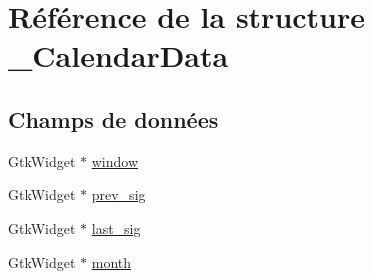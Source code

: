 \hypertarget{struct___calendar_data}{\section{Référence de la structure \-\_\-\-Calendar\-Data}
\label{struct___calendar_data}
}
\subsection*{Champs de données}
\begin{DoxyCompactItemize}
\item 
Gtk\-Widget $\ast$ \hyperlink{struct___calendar_data_a3d346c08cf2d67c388caabffb412b293}{window}
\item 
Gtk\-Widget $\ast$ \hyperlink{struct___calendar_data_aa524f6742b14404edf6891773daae7dd}{prev\-\_\-sig}
\item 
Gtk\-Widget $\ast$ \hyperlink{struct___calendar_data_a622d485dedd866926880ea6f497ab0d0}{last\-\_\-sig}
\item 
Gtk\-Widget $\ast$ \hyperlink{struct___calendar_data_aaf4edd0a3a5d01ee0e044403180a66e0}{month}
\end{DoxyCompactItemize}


